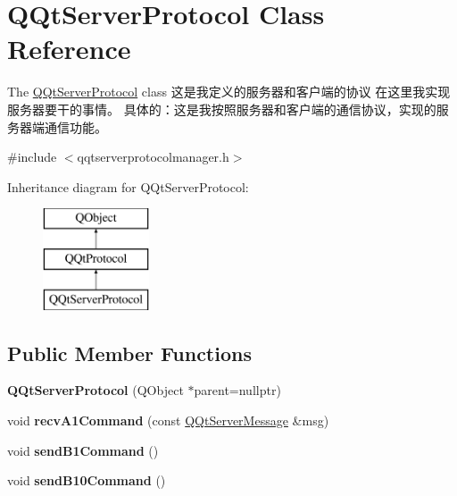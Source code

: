 \hypertarget{class_q_qt_server_protocol}{}\section{Q\+Qt\+Server\+Protocol Class Reference}
\label{class_q_qt_server_protocol}


The \mbox{\hyperlink{class_q_qt_server_protocol}{Q\+Qt\+Server\+Protocol}} class 这是我定义的服务器和客户端的协议 在这里我实现服务器要干的事情。 具体的：这是我按照服务器和客户端的通信协议，实现的服务器端通信功能。  




{\ttfamily \#include $<$qqtserverprotocolmanager.\+h$>$}

Inheritance diagram for Q\+Qt\+Server\+Protocol\+:\begin{figure}[H]
\begin{center}
\leavevmode
\includegraphics[height=3.000000cm]{class_q_qt_server_protocol}
\end{center}
\end{figure}
\subsection*{Public Member Functions}
\begin{DoxyCompactItemize}
\item 
\mbox{\label{class_q_qt_server_protocol_af60a54fa1e575ae9141dbe252a8f16be}} 
{\bfseries Q\+Qt\+Server\+Protocol} (Q\+Object $\ast$parent=nullptr)
\item 
\mbox{\label{class_q_qt_server_protocol_aecc9da1eb60fb9fed7988b31cd77276b}} 
void {\bfseries recv\+A1\+Command} (const \mbox{\hyperlink{class_q_qt_server_message}{Q\+Qt\+Server\+Message}} \&msg)
\item 
\mbox{\label{class_q_qt_server_protocol_a115f73ff05048748e603dc7592437e25}} 
void {\bfseries send\+B1\+Command} ()
\item 
\mbox{\label{class_q_qt_server_protocol_a5b86b55121ea1ddda182cfac82ffa1f0}} 
void {\bfseries send\+B10\+Command} ()
\end{DoxyCompactItemize}
